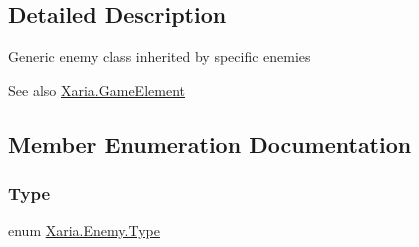 \subsection{Detailed Description}
Generic enemy class inherited by specific enemies 

\begin{DoxySeeAlso}{See also}
\hyperlink{classXaria_1_1GameElement}{Xaria.\+Game\+Element}


\end{DoxySeeAlso}


\subsection{Member Enumeration Documentation}
\mbox{\label{classXaria_1_1Enemy_af736652ccf0a3aabacb41bd1afd41234}} 
\subsubsection{\texorpdfstring{Type}{Type}}
{\footnotesize\ttfamily enum \hyperlink{classXaria_1_1Enemy_af736652ccf0a3aabacb41bd1afd41234}{Xaria.\+Enemy.\+Type}\hspace{0.3cm}{\ttfamily [strong]}}





